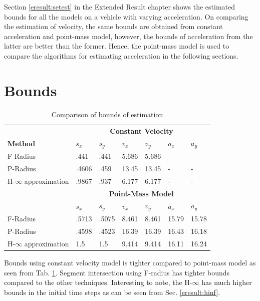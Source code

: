 Section \ref{eresult:setest} in the Extended Result chapter shows the estimated bounds for all the models on a vehicle with varying acceleration. On comparing the estimation of velocity, the same bounds are obtained from constant acceleration and point-mass model, however, the bounds of acceleration from the latter are better than the former. Hence, the point-mass model is used to compare the algorithms for estimating acceleration in the following sections.


\section{Bounds}
\begin{table}[htbp]
\caption{Comparison of bounds of estimation\\}
	\centering
	\renewcommand{\arraystretch}{1.1}
	\small	
	\begin{tabular}{l l l l l l l}
		\toprule 
		& \multicolumn{6}{c}{\textbf{Constant Velocity}}\\
		\textbf{Method} & \textbf{$s_x$} & \textbf{$s_y$} & \textbf{$v_x$} & \textbf{$v_y$} & \textbf{$a_x$} & \textbf{$a_y$}\\ \midrule
		F-Radius & .441 & .441 & 5.686 & 5.686 & - & -\\
		P-Radius & .4606 & .459 & 13.45 & 13.45 & - &	-\\
		H-$\infty$ approximation & .9867 &	.937 &	6.177 & 6.177 & - &-\\
		
		& \multicolumn{6}{c}{\textbf{Point-Mass Model}}\\
		 & \textbf{$s_x$} & \textbf{$s_y$} & \textbf{$v_x$} & \textbf{$v_y$} & \textbf{$a_x$} & \textbf{$a_y$}\\ \midrule
		F-Radius & .5713 &	.5075 &	8.461	& 8.461 &	15.79 &	15.78\\
		P-Radius & .4598 &	.4523 &	16.39 &	16.39 &	16.43 &	16.18\\
		H-$\infty$ approximation & 1.5 & 1.5 & 9.414 &	9.414 &	16.11 &	16.24\\
		\bottomrule
	\end{tabular}
	\label{tab:bound}
\end{table}
Bounds using constant velocity model is tighter compared to point-mass model as seen from Tab. \ref{tab:bound}. Segment intersection using F-radius has tighter bounds compared to the other techniques. Interesting to note, the H-$\infty$ has much higher bounds in the initial time steps as can be seen from Sec. \ref{eresult:hinf}.


